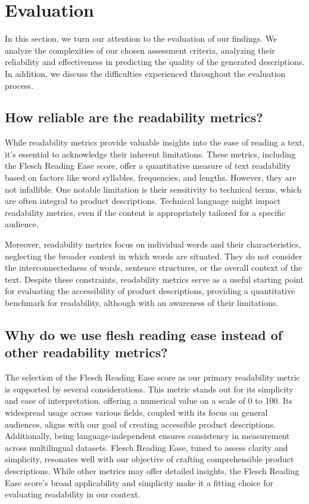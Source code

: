 \section{Evaluation}

In this section, we turn our attention to the evaluation of our findings. We analyze the complexities of our chosen assessment criteria, analyzing their reliability and effectiveness in predicting the quality of the generated descriptions. In addition, we discuss the difficulties experienced throughout the evaluation process.

\subsection{How reliable are the readability metrics?}

While readability metrics provide valuable insights into the ease of reading a text, it's essential to acknowledge their inherent limitations. These metrics, including the Flesch Reading Ease score, offer a quantitative measure of text readability based on factors like word syllables, frequencies, and lengths. However, they are not infallible. One notable limitation is their sensitivity to technical terms, which are often integral to product descriptions. Technical language might impact readability metrics, even if the content is appropriately tailored for a specific audience.

Moreover, readability metrics focus on individual words and their characteristics, neglecting the broader context in which words are situated. They do not consider the interconnectedness of words, sentence structures, or the overall context of the text. Despite these constraints, readability metrics serve as a useful starting point for evaluating the accessibility of product descriptions, providing a quantitative benchmark for readability, although with an awareness of their limitations.

\subsection{Why do we use flesh reading ease instead of other readability metrics?}
The selection of the Flesch Reading Ease score as our primary readability metric is supported by several considerations. This metric stands out for its simplicity and ease of interpretation, offering a numerical value on a scale of 0 to 100. Its widespread usage across various fields, coupled with its focus on general audiences, aligns with our goal of creating accessible product descriptions. Additionally, being language-independent ensures consistency in measurement across multilingual datasets. Flesch Reading Ease, tuned to assess clarity and simplicity, resonates well with our objective of crafting comprehensible product descriptions. While other metrics may offer detailed insights, the Flesch Reading Ease score's broad applicability and simplicity make it a fitting choice for evaluating readability in our context.

